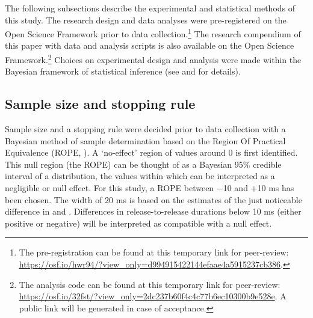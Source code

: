 \documentclass[12pt,a4paper,]{article}
\begin{document}
The following subsections describe the experimental and statistical
methods of this study. The research design and data analyses were
pre-registered on the Open Science Framework prior to data
collection.\footnote{The pre-registration can be found at this temporary link for peer-review: \url{https://osf.io/hwr94/?view_only=d994915422144efaae4a5915237cb386}.}
The research compendium of this paper with data \citep{coretta2019g} and
analysis scripts is also available on the Open Science
Framework.\footnote{The analysis code can be found at this temporary link for peer-review: \url{https://osf.io/32fst/?view_only=2dc237b60f4c4c77b6ec10300b9e528e}. A public link will be generated in case of acceptance.}
Choices on experimental design and analysis were made within the
Bayesian framework of statistical inference (see 
and  for details).

\hypertarget{sample-size-and-stopping-rule}{%
\subsection{Sample size and stopping
rule}\label{sample-size-and-stopping-rule}}

\label{s:sample-size}

Sample size and a stopping rule were decided prior to data collection
with a Bayesian method of sample determination based on the Region Of
Practical Equivalence (ROPE, \citealt{kruschke2015, vasishth2018a}). A
`no-effect' region of values around 0 is first identified. This null
region (the ROPE) can be thought of as a Bayesian 95\% credible interval
of a distribution, the values within which can be interpreted as a
negligible or null effect. For this study, a ROPE between −10 and +10 ms
has been chosen. The width of 20 ms is based on the estimates of the
just noticeable difference in \citet{huggins1972} and
\citet{nooteboom1980}. Differences in release-to-release durations below
10 ms (either positive or negative) will be interpreted as compatible
with a null effect.
\end{document}
